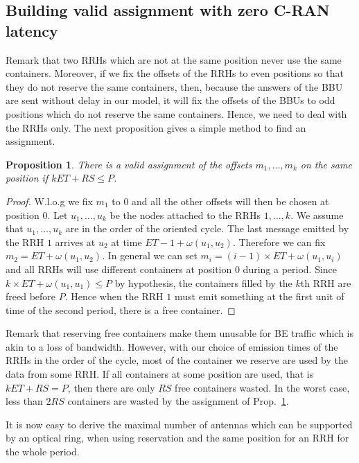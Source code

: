 \documentclass[10pt, conference, letterpaper]{IEEEtran}
\newtheorem{prop}{Proposition}
\begin{document}
 \subsection{Building valid assignment with zero C-RAN latency}\label{sec:zerolatency}
Remark that two RRHs which are not at the same position never use the same containers. Moreover, if we fix the offsets of the RRHs to even positions so that they do not reserve the same containers, then, because the answers of the BBU are sent without delay in our model, it will fix the offsets of the BBUs to odd positions which do not reserve the same containers. Hence, we need to deal with the RRHs only.
The next proposition gives a simple method to find an assignment.

\begin{prop}
\label{prop:assign}
There is a valid assignment of the offsets $m_1, \dots, m_k$ on the same position if  $k ET + RS \leq P$.
\end{prop}
\begin{proof}
 W.l.o.g we fix $m_1$ to $0$ and all the other offsets will then be chosen at position $0$.  Let $u_1,\dots,u_k$ be the nodes attached to the RRHs $1,\dots,k$. We assume that $u_1,\dots,u_k$ are in the order of the oriented cycle. The last message emitted by the RRH $1$ arrives at $u_2$ at time $ET - 1 + \omega(u_1,u_2)$. Therefore we can fix $m_2 =  ET  + \omega(u_1,u_2)$. In general we can set $m_i = (i-1) \times ET + \omega(u_1,u_i)$ and all RRHs will use different containers at position $0$ during a period. Since $k \times ET + \omega(u_1,u_1) \leq P$ by hypothesis,
 the containers filled by the $k$th RRH are freed before $P$. Hence when the RRH $1$ must emit something at the first unit of time of the second period, there is a free container.
\end{proof}

Remark that reserving free containers make them unusable for BE traffic which is akin to a loss of bandwidth. However, with our choice of emission times of the RRHs in the order of the cycle, most of the container we reserve are used by the data from some RRH. If all containers at some position are used, that is $kET +RS = P$, then there are only $RS$ free containers wasted. In the worst case, less than $2RS$ containers are wasted by the assignment of Prop.~\ref{prop:assign}. 

It is now easy to derive the maximal number of antennas which can be supported by an optical ring, when using reservation and the same position for an RRH for the whole period.
\end{document}
